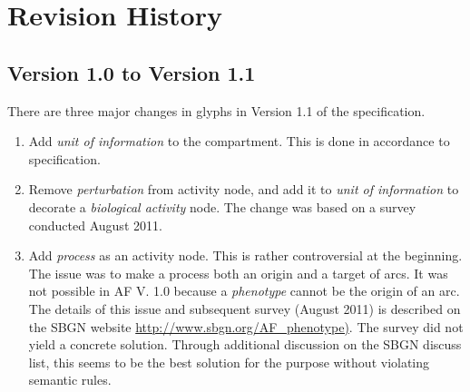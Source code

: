 \chapter{Revision History}

\section{Version 1.0 to Version 1.1}

There are three major changes in glyphs in Version 1.1 of the \SBGNAFLone specification. 
\begin{enumerate}
\item{Add \emph{unit of information} to the compartment.  This is done in accordance to \SBGNPDLone specification.}
\item{Remove \emph{perturbation} from activity node, and add it to \emph{unit of information} to decorate a \emph{biological activity} node.  The change was based on a survey conducted August 2011.
}
\item{Add \emph{process} as an activity node. This is rather controversial at the beginning.  The issue was to make a process both an origin and a target of arcs.  It was not possible in AF V. 1.0 because a \emph{phenotype} cannot be the origin of an arc.  The details of this issue and subsequent survey (August 2011) is described on the SBGN website \url{http://www.sbgn.org/AF_phenotype)}. The survey did not yield a concrete solution.  Through additional discussion on the SBGN discuss list, this seems to be the best solution for the purpose without violating semantic rules.
}
\end{enumerate}

